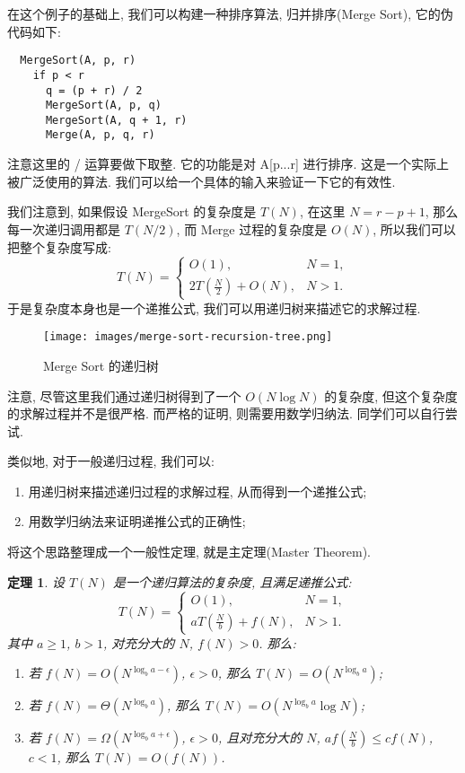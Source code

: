 \documentclass[a4paper]{ctexart}
\newtheorem{theorem}{定理}
\theoremstyle{definition}
\theoremstyle{definition}
\begin{document}
在这个例子的基础上, 我们可以构建一种排序算法, 归并排序(Merge Sort), 它的伪代码如下:
\begin{verbatim}
  MergeSort(A, p, r)
    if p < r
      q = (p + r) / 2
      MergeSort(A, p, q)
      MergeSort(A, q + 1, r)
      Merge(A, p, q, r)
\end{verbatim}
注意这里的 / 运算要做下取整. 它的功能是对 A[p...r] 进行排序. 这是一个实际上被广泛使用的算法. 
我们可以给一个具体的输入来验证一下它的有效性.

我们注意到, 如果假设 MergeSort 的复杂度是 $T(N)$, 在这里 $N = r - p + 1$, 
那么每一次递归调用都是 $T(N / 2)$, 而 Merge 过程的复杂度是 $O(N)$, 所以我们可以把整个复杂度写成:
\begin{equation}
  T(N) = \left\{
    \begin{array}{ll}
      O(1), & N = 1, \\
      2 T(\frac{N}{2}) + O(N), & N > 1.
    \end{array}
  \right.
\end{equation}
于是复杂度本身也是一个递推公式, 我们可以用递归树来描述它的求解过程.

\begin{figure}[htbp]
  \centering
  \texttt{[image: images/merge-sort-recursion-tree.png]}
  \caption{Merge Sort 的递归树}
  \label{fig:merge-sort-recursion-tree}
\end{figure}

注意, 尽管这里我们通过递归树得到了一个 $O(N \log N)$ 的复杂度, 但这个复杂度的求解过程并不是很严格.
而严格的证明, 则需要用数学归纳法. 同学们可以自行尝试.

类似地, 对于一般递归过程, 我们可以:
\begin{enumerate}
  \item 用递归树来描述递归过程的求解过程, 从而得到一个递推公式;
  \item 用数学归纳法来证明递推公式的正确性;
\end{enumerate}
将这个思路整理成一个一般性定理, 就是主定理(Master Theorem).

\begin{theorem}
  设 $T(N)$ 是一个递归算法的复杂度, 且满足递推公式:
  \begin{equation}
    T(N) = \left\{
      \begin{array}{ll}
        O(1), & N = 1, \\
        a T(\frac{N}{b}) + f(N), & N > 1.
      \end{array}
    \right.
  \end{equation}
  其中 $a \geq 1$, $b > 1$, 对充分大的 $N$, $f(N) > 0$. 那么:
  \begin{enumerate}
    \item 若 $f(N) = O(N^{\log_b a - \epsilon})$, $\epsilon > 0$, 那么 $T(N) = O(N^{\log_b a})$;
    \item 若 $f(N) = \Theta(N^{\log_b a})$, 那么 $T(N) = O(N^{\log_b a} \log N)$;
    \item 若 $f(N) = \Omega(N^{\log_b a + \epsilon})$, $\epsilon > 0$, 且对充分大的 $N$, $a f(\frac{N}{b}) \leq c f(N)$, $c < 1$, 那么 $T(N) = O(f(N))$.
  \end{enumerate}
\end{theorem}
\end{document}
